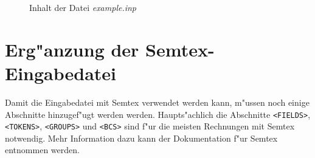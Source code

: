\documentclass{article}
\begin{document}
\begin{figure}[hbp]
\centering

\caption{Inhalt der Datei \emph{example.inp}}
\end{figure}

\section{Erg"anzung der Semtex-Eingabedatei}

Damit die Eingabedatei mit Semtex verwendet werden kann, m"ussen noch einige Abschnitte hinzugef"ugt werden werden. Haupts"achlich die Abschnitte \verb|<FIELDS>|, \verb|<TOKENS>|, \verb|<GROUPS>| und \verb|<BCS>| sind f"ur die meisten Rechnungen mit Semtex notwendig. Mehr Information dazu kann der Dokumentation f"ur Semtex entnommen werden.
\end{document}

